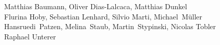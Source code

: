 %
%
%
Matthias Baumann,
Oliver Dias-Lalcaca,
Matthias Dunkel%
\\
Flurina Hoby,
Sebastian Lenhard,
Silvio Marti,
Michael~Müller%
\\
Hansruedi~Patzen,
Melina~Staub,
Martin~Stypinski,
Nicolas Tobler%
\\
Raphael Unterer
